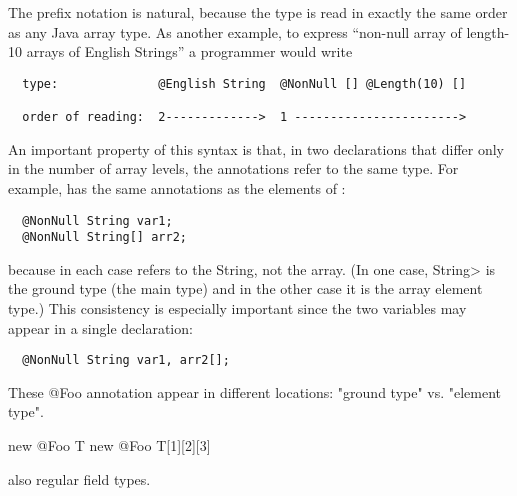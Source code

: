 \documentclass[10pt]{article}
\newcommand{\preverbnegspace}{\vspace{-5pt}}
\begin{document}
The prefix notation is natural, because the type is read in exactly
the same order as any Java array type.  As another example, to express
``non-null array of length-10 arrays of English Strings'' a programmer
would write

\begin{Verbatim}
  type:              @English String  @NonNull [] @Length(10) []

  order of reading:  2------------->  1 ----------------------->
\end{Verbatim}




An important property of this syntax is that, in two declarations that
differ only in the number of array levels, the annotations refer to the same
type.  For example,  has
the same annotations as the elements of :

\preverbnegspace
\begin{Verbatim}
  @NonNull String var1;
  @NonNull String[] arr2;
\end{Verbatim}

\noindent
because in each case  refers to the String, not the array.
(In one case, \<String> is the ground type (the main type) and in the other
case it is the array element type.)
This consistency is especially important since the two variables may appear in a single
declaration:

\preverbnegspace
\begin{Verbatim}
  @NonNull String var1, arr2[];
\end{Verbatim}

These @Foo annotation appear in different locations:
"ground type" vs. "element type".

new @Foo T
new @Foo T[1][2][3]

also regular field types.


% 


\end{document}
